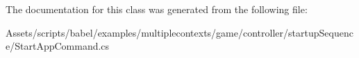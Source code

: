 The documentation for this class was generated from the following file\-:\begin{DoxyCompactItemize}
\item 
Assets/scripts/babel/examples/multiplecontexts/game/controller/startup\-Sequence/Start\-App\-Command.\-cs\end{DoxyCompactItemize}
